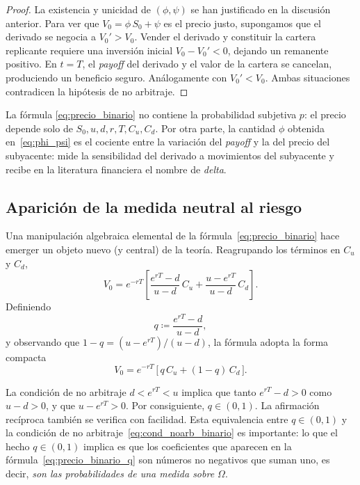 \documentclass[11pt,a4paper,oneside]{report}
\theoremstyle{plain}
\theoremstyle{definition}
\theoremstyle{remark}
\newcommand{\1}{\mathbf{1}}
\newcommand{\eqdef}{\coloneqq}
\begin{document}
\begin{proof}
La existencia y unicidad de $(\phi, \psi)$ se han justificado en la
discusión anterior. Para ver que $V_0 = \phi\, S_0 + \psi$ es el
precio justo, supongamos que el derivado se negocia a $V_0' > V_0$.
Vender el derivado y constituir la cartera replicante requiere una
inversión inicial $V_0 - V_0' < 0$, dejando un remanente positivo. En
$t = T$, el \emph{payoff} del derivado y el valor de la cartera se
cancelan, produciendo un beneficio seguro. Análogamente con $V_0' <
V_0$. Ambas situaciones contradicen la hipótesis de no arbitraje.
\end{proof}

La fórmula
\eqref{eq:precio_binario} no contiene la probabilidad subjetiva $p$:
el precio depende solo de $S_0, u, d, r, T, C_u, C_d$. Por otra
parte, la cantidad $\phi$ obtenida en~\eqref{eq:phi_psi} es el
cociente entre la variación del \emph{payoff} y la del precio del
subyacente: mide la sensibilidad del derivado a movimientos del
subyacente y recibe en la literatura financiera el nombre de
\emph{delta}.

\subsection{Aparición de la medida neutral al riesgo}
\label{subsec:medida_riesgo}

Una manipulación algebraica elemental de la fórmula~\eqref{eq:precio_binario}
hace emerger un objeto nuevo (y central) de la teoría.
Reagrupando los términos en $C_u$ y $C_d$,
\begin{equation*}
  V_0 = e^{-rT}\!\left[\frac{e^{rT} - d}{u - d}\, C_u
                       + \frac{u - e^{rT}}{u - d}\, C_d\right].
\end{equation*}
Definiendo
\begin{equation}\label{eq:def_q}
  q \eqdef \frac{e^{rT} - d}{u - d},
\end{equation}
y observando que $1 - q = (u - e^{rT})/(u - d)$, la fórmula adopta la
forma compacta
\begin{equation}\label{eq:precio_binario_q}
  V_0 = e^{-rT}\,\bigl[\,q\, C_u + (1 - q)\, C_d\,\bigr].
\end{equation}

La condición de no
arbitraje $d < e^{rT} < u$ implica que tanto $e^{rT} - d > 0$ como $u -
d > 0$, y que $u - e^{rT} > 0$. Por consiguiente, $q \in (0, 1)$. La
afirmación recíproca también se verifica con facilidad. Esta
equivalencia entre $q \in (0,1)$ y la condición de no
arbitraje~\eqref{eq:cond_noarb_binario} es importante: lo que el
hecho $q \in (0,1)$ implica es que los coeficientes que aparecen en la
fórmula~\eqref{eq:precio_binario_q} son números no negativos que suman
uno, es decir, \emph{son las probabilidades de una medida sobre $\Omega$}.
\end{document}

